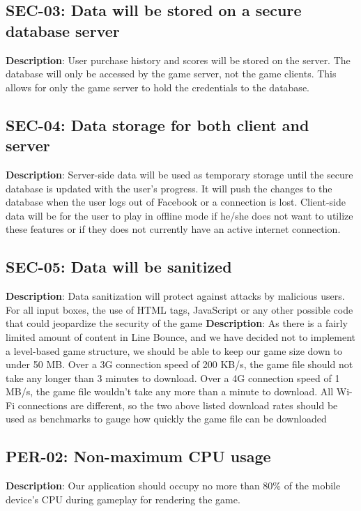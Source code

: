 \subsection{SEC-03: Data will be stored on a secure database server}
\textbf{Description}: User purchase history and scores will be stored on the
server. The database will only be accessed by the game server, not
the game clients. This allows for only the game server to hold the
credentials to the database. 

\subsection{SEC-04: Data storage for both client and server}
\textbf{Description}: Server-side data will be used as temporary storage until
the secure database is updated with the user\textquoteright{}s progress.
It will push the changes to the database when the user logs out of
Facebook or a connection is lost. Client-side data will be for the
user to play in offline mode if he/she does not want to utilize these
features or if they does not currently have an active internet connection.

\subsection{SEC-05: Data will be sanitized}
\textbf{Description}: Data sanitization will protect against attacks by malicious
users. For all input boxes, the use of HTML tags, JavaScript or any
other possible code that could jeopardize the security of the game
\textbf{Description}: As there is a fairly limited amount of content in Line
Bounce, and we have decided not to implement a level-based game structure,
we should be able to keep our game size down to under 50 MB. Over
a 3G connection speed of 200 KB/s, the game file should not take any
longer than 3 minutes to download. Over a 4G connection speed of 1
MB/s, the game file wouldn\textquoteright{}t take any more than a
minute to download. All Wi-Fi connections are different, so the two
above listed download rates should be used as benchmarks to gauge
how quickly the game file can be downloaded

\subsection{PER-02: Non-maximum CPU usage}
\textbf{Description}: Our application should occupy no more than 80\% of the
mobile device\textquoteright{}s CPU during gameplay for rendering
the game. 

